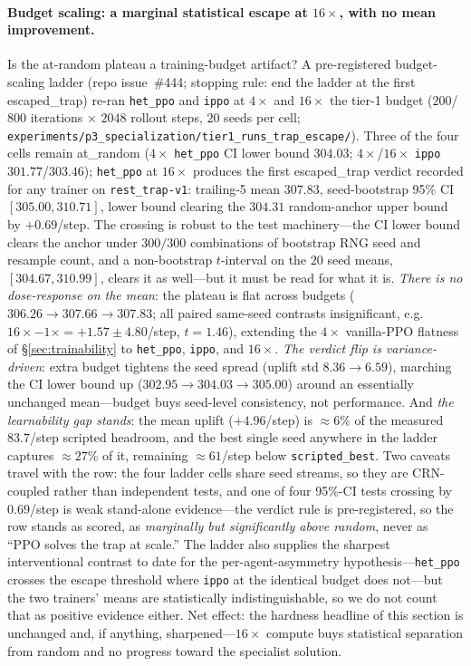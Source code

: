 \documentclass{anvil-paper}
\begin{document}
\paragraph{Budget scaling: a marginal statistical escape at
$16{\times}$, with no mean improvement.}
Is the at-random plateau a training-budget artifact? A pre-registered
budget-scaling ladder (repo issue~\#444; stopping rule: end the ladder
at the first \textsf{escaped\_trap}) re-ran \texttt{het\_ppo} and
\texttt{ippo} at $4{\times}$ and $16{\times}$ the tier-1 budget
($200$/$800$ iterations $\times$ $2048$ rollout steps, $20$ seeds per
cell;
\texttt{experiments/p3\_specialization/tier1\_runs\_trap\_escape/}).
Three of the four cells remain \textsf{at\_random} ($4{\times}$
\texttt{het\_ppo} CI lower bound $304.03$; $4{\times}$/$16{\times}$
\texttt{ippo} $301.77$/$303.46$); \texttt{het\_ppo} at $16{\times}$
produces the first \textsf{escaped\_trap} verdict recorded for any
trainer on \texttt{rest\_trap-v1}: trailing-5 mean $307.83$,
seed-bootstrap 95\% CI $[305.00, 310.71]$, lower bound clearing the
$304.31$ random-anchor upper bound by $+0.69$/step. The crossing is
robust to the test machinery---the CI lower bound clears the anchor
under $300/300$ combinations of bootstrap RNG seed and resample count,
and a non-bootstrap $t$-interval on the $20$ seed means,
$[304.67, 310.99]$, clears it as well---but it must be read for what
it is. \emph{There is no dose-response on the mean}: the plateau is
flat across budgets ($306.26 \to 307.66 \to 307.83$; all paired
same-seed contrasts insignificant, e.g.\
$16{\times}{-}1{\times} = {+}1.57 \pm 4.80$/step, $t{=}1.46$),
extending the $4{\times}$ vanilla-PPO flatness of
\S\ref{sec:trainability} to \texttt{het\_ppo}, \texttt{ippo}, and
$16{\times}$. \emph{The verdict flip is variance-driven}: extra budget
tightens the seed spread (uplift std $8.36 \to 6.59$), marching the CI
lower bound up ($302.95 \to 304.03 \to 305.00$) around an essentially
unchanged mean---budget buys seed-level consistency, not performance.
And \emph{the learnability gap stands}: the mean uplift
(${+}4.96$/step) is ${\approx}6\%$ of the measured $83.7$/step scripted
headroom, and the best single seed anywhere in the ladder captures
${\approx}27\%$ of it, remaining ${\approx}61$/step below
\texttt{scripted\_best}. Two caveats travel with the row: the four
ladder cells share seed streams, so they are CRN-coupled rather than
independent tests, and one of four 95\%-CI tests crossing by
$0.69$/step is weak stand-alone evidence---the verdict rule is
pre-registered, so the row stands as scored, as \emph{marginally but
significantly above random}, never as ``PPO solves the trap at
scale.'' The ladder also supplies the sharpest interventional contrast
to date for the per-agent-asymmetry hypothesis---\texttt{het\_ppo}
crosses the escape threshold where \texttt{ippo} at the identical
budget does not---but the two trainers' means are statistically
indistinguishable, so we do not count that as positive evidence
either. Net effect: the hardness headline of this section is
unchanged and, if anything, sharpened---$16{\times}$ compute buys
statistical separation from random and no progress toward the
specialist solution.
\end{document}
